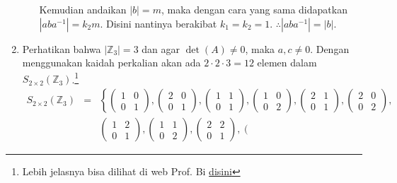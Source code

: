 \documentclass[10pt,openany,a4paper]{article}
\newcommand{\Z}{\mathbb{Z}}
\begin{document}
\begin{enumerate}
\begin{itemize}
        Kemudian andaikan $|b|=m$, maka dengan cara yang sama didapatkan $|aba^{-1}|=k_2m$. Disini nantinya berakibat $k_1=k_2=1$. 
        $\therefore |aba^{-1}|=|b|$.
    \end{itemize}
    \item Perhatikan bahwa $|\Z_3|=3$ dan agar $\det(A)\ne 0$, maka $a,c\ne 0$. Dengan menggunakan kaidah perkalian akan ada $2\cdot 2\cdot 3=12$ elemen dalam $S_{2\times 2}(\Z_3)$.\footnote{Lebih jelasnya bisa dilihat di web Prof. Bi \href{https://sites.google.com/view/aljabar-i/grup/pembahasan-soal-soal?authuser=0}{disini}}
    \begin{eqnarray*}
        S_{2\times 2}(\mathbb{Z}_3)&=&\left\{\left(\begin{array}{rr}
        1 & 0 \\
        0 & 1
        \end{array}\right), \left(\begin{array}{rr}
        2 & 0 \\
        0 & 1
        \end{array}\right), \left(\begin{array}{rr}
        1 & 1 \\
        0 & 1
        \end{array}\right), \left(\begin{array}{rr}
        1 & 0 \\
        0 & 2
        \end{array}\right), \left(\begin{array}{rr}
        2 & 1 \\
        0 & 1
        \end{array}\right), \left(\begin{array}{rr}
        2 & 0 \\
        0 & 2
        \end{array}\right)\right.,\\
        && \left. \left(\begin{array}{rr}
        1 & 2 \\
        0 & 1
        \end{array}\right), \left(\begin{array}{rr}
        1 & 1 \\
        0 & 2
        \end{array}\right), \left(\begin{array}{rr}
        2 & 2 \\
        0 & 1
        \end{array}\right), \left(\begin{array}{rr}

\end{array}
\end{eqnarray*}
\end{enumerate}
\end{document}
